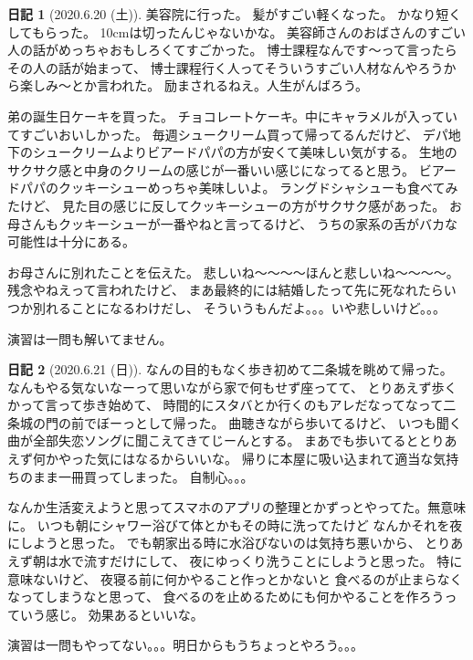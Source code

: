 \documentclass[uplatex]{jsarticle}
\theoremstyle{definition}
\newtheorem*{nikki*}{日記}
\begin{document}
\begin{nikki*}[2020.6.20 (土)]
  美容院に行った。
  髪がすごい軽くなった。
  かなり短くしてもらった。
  10cmは切ったんじゃないかな。
  美容師さんのおばさんのすごい人の話がめっちゃおもしろくてすごかった。
  博士課程なんです〜って言ったらその人の話が始まって、
  博士課程行く人ってそういうすごい人材なんやろうから楽しみ〜とか言われた。
  励まされるねえ。人生がんばろう。

  弟の誕生日ケーキを買った。
  チョコレートケーキ。中にキャラメルが入っていてすごいおいしかった。
  毎週シュークリーム買って帰ってるんだけど、
  デパ地下のシュークリームよりビアードパパの方が安くて美味しい気がする。
  生地のサクサク感と中身のクリームの感じが一番いい感じになってると思う。
  ビアードパパのクッキーシューめっちゃ美味しいよ。
  ラングドシャシューも食べてみたけど、
  見た目の感じに反してクッキーシューの方がサクサク感があった。
  お母さんもクッキーシューが一番やねと言ってるけど、
  うちの家系の舌がバカな可能性は十分にある。

  お母さんに別れたことを伝えた。
  悲しいね〜〜〜〜ほんと悲しいね〜〜〜〜。
  残念やねえって言われたけど、
  まあ最終的には結婚したって先に死なれたらいつか別れることになるわけだし、
  そういうもんだよ。。。いや悲しいけど。。。

  演習は一問も解いてません。
\end{nikki*}


\begin{nikki*}[2020.6.21 (日)]
  なんの目的もなく歩き初めて二条城を眺めて帰った。
  なんもやる気ないなーって思いながら家で何もせず座ってて、
  とりあえず歩くかって言って歩き始めて、
  時間的にスタバとか行くのもアレだなってなって二条城の門の前でぼーっとして帰った。
  曲聴きながら歩いてるけど、
  いつも聞く曲が全部失恋ソングに聞こえてきてじーんとする。
  まあでも歩いてるととりあえず何かやった気にはなるからいいな。
  帰りに本屋に吸い込まれて適当な気持ちのまま一冊買ってしまった。
  自制心。。。

  なんか生活変えようと思ってスマホのアプリの整理とかずっとやってた。無意味に。
  いつも朝にシャワー浴びて体とかもその時に洗ってたけど
  なんかそれを夜にしようと思った。
  でも朝家出る時に水浴びないのは気持ち悪いから、
  とりあえず朝は水で流すだけにして、
  夜にゆっくり洗うことにしようと思った。
  特に意味ないけど、
  夜寝る前に何かやること作っとかないと
  食べるのが止まらなくなってしまうなと思って、
  食べるのを止めるためにも何かやることを作ろうっていう感じ。
  効果あるといいな。

  演習は一問もやってない。。。明日からもうちょっとやろう。。。
\end{nikki*}
\end{document}
